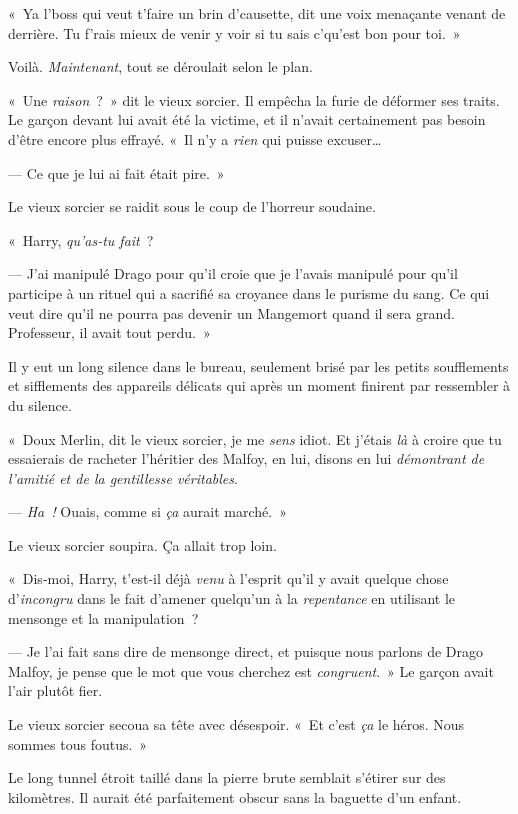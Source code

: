 «~Ya l'boss qui veut t'faire un brin d'causette, dit une voix menaçante venant de derrière. Tu f'rais mieux de venir y voir si tu sais c'qu'est bon pour toi.~»

Voilà. \emph{Maintenant}, tout se déroulait selon le plan.


«~Une \emph{raison}~?~» dit le vieux sorcier. Il empêcha la furie de déformer ses traits. Le garçon devant lui avait été la victime, et il n'avait certainement pas besoin d'être encore plus effrayé. «~Il n'y a \emph{rien} qui puisse excuser…

--- Ce que je lui ai fait était pire.~»

Le vieux sorcier se raidit sous le coup de l'horreur soudaine.

«~Harry, \emph{qu'as-tu fait}~?

--- J'ai manipulé Drago pour qu'il croie que je l'avais manipulé pour qu'il participe à un rituel qui a sacrifié sa croyance dans le purisme du sang. Ce qui veut dire qu'il ne pourra pas devenir un Mangemort quand il sera grand. Professeur, il avait tout perdu.~»

Il y eut un long silence dans le bureau, seulement brisé par les petits soufflements et sifflements des appareils délicats qui après un moment finirent par ressembler à du silence.

«~Doux Merlin, dit le vieux sorcier, je me \emph{sens} idiot. Et j'étais \emph{là} à croire que tu essaierais de racheter l'héritier des Malfoy, en lui, disons en lui \emph{démontrant de l'amitié et de la gentillesse véritables}.

--- \emph{Ha~!} Ouais, comme si \emph{ça} aurait marché.~»

Le vieux sorcier soupira. Ça allait trop loin.

«~Dis-moi, Harry, t'est-il déjà \emph{venu} à l'esprit qu'il y avait quelque chose d'\emph{incongru} dans le fait d'amener quelqu'un à la \emph{repentance} en utilisant le mensonge et la manipulation~?

--- Je l'ai fait sans dire de mensonge direct, et puisque nous parlons de Drago Malfoy, je pense que le mot que vous cherchez est \emph{congruent}.~» Le garçon avait l'air plutôt fier.

Le vieux sorcier secoua sa tête avec désespoir. «~Et c'est \emph{ça} le héros. Nous sommes tous foutus.~»


Le long tunnel étroit taillé dans la pierre brute semblait s'étirer sur des kilomètres. Il aurait été parfaitement obscur sans la baguette d'un enfant.

